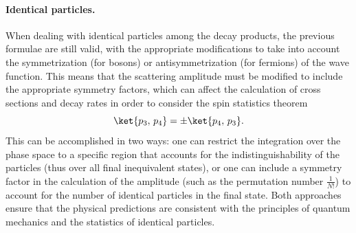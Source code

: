 \paragraph{Identical particles.} When dealing with identical particles among the decay products, the previous formulae are still valid, with the appropriate modifications to take into account the symmetrization (for bosons) or antisymmetrization (for fermions) of the wave function. This means that the scattering amplitude must be modified to include the appropriate symmetry factors, which can affect the calculation of cross sections and decay rates in order to consider the spin statistics theorem
\[
    \ket{p_3,\,p_4} = \pm \ket{p_4,\,p_3}.
\]
This can be accomplished in two ways: one can restrict the integration over the phase space to a specific region that accounts for the indistinguishability of the particles (thus over all final inequivalent states), or one can include a symmetry factor in the calculation of the amplitude (such as the permutation number \(\frac{1}{N!}\)) to account for the number of identical particles in the final state. Both approaches ensure that the physical predictions are consistent with the principles of quantum mechanics and the statistics of identical particles.